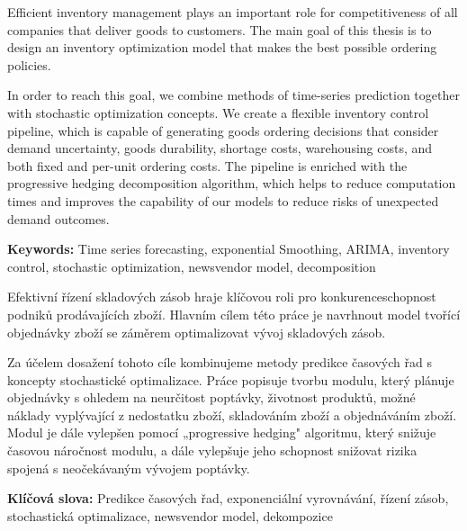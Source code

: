 \documentclass[11pt,a4paper]{article}
\newenvironment{abstractpage}
  {\cleardoublepage\thispagestyle{empty}}
  {\newpage}
\renewenvironment{abstract}[1]
  {\bigskip\selectlanguage{#1}%
   \begin{center}\bfseries\abstractname\end{center}}
  {\par\bigskip}
\begin{document}
\newpage

\newpage

\begin{abstractpage}
\begin{abstract}{english}
Efficient inventory management plays an important role for competitiveness of all companies that deliver goods to customers.
The main goal of this thesis is to design an inventory optimization model that makes the best possible ordering policies.

In order to reach this goal, we combine methods of time-series prediction together with stochastic optimization concepts. We create a flexible inventory control pipeline, which is capable of generating goods ordering decisions that consider demand uncertainty, goods durability, shortage costs, warehousing costs, and both fixed and per-unit ordering costs. The pipeline is enriched with the progressive hedging decomposition algorithm, which helps to reduce computation times and improves the capability of our models to reduce risks of unexpected demand outcomes.

\textbf{Keywords:} Time series forecasting, exponential Smoothing, ARIMA, inventory control, stochastic optimization, newsvendor model, decomposition
\end{abstract}

\begin{abstract}{czech}
Efektivní řízení skladových zásob hraje klíčovou roli pro konkurenceschopnost podniků prodávajících zboží.
Hlavním cílem této práce je navrhnout model tvořící objednávky zboží se záměrem optimalizovat vývoj skladových zásob. 

Za účelem dosažení tohoto cíle kombinujeme metody predikce časových řad s koncepty stochastické optimalizace. Práce popisuje tvorbu modulu, který plánuje objednávky s ohledem na neurčitost poptávky, životnost produktů, možné náklady vyplývající z nedostatku zboží, skladováním zboží a objednáváním zboží. Modul je dále vylepšen pomocí „progressive hedging" algoritmu, který snižuje časovou náročnost modulu, a dále vylepšuje jeho schopnost snižovat rizika spojená s neočekávaným vývojem poptávky.

\textbf{Klíčová slova:} Predikce časových řad, exponenciální vyrovnávání, řízení zásob, stochastická optimalizace, newsvendor model, dekompozice
\end{abstract}
\end{abstractpage}

\tableofcontents
\newpage
{}
\thispagestyle{empty}
\phantom{a} 
\newpage
\setcounter{page}{1}
\end{document}
